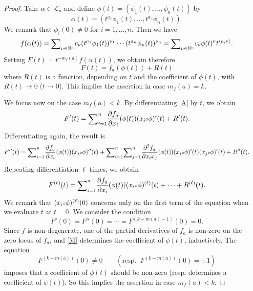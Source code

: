 \documentclass[12pt,a4paper,leqno]{amsart}
\theoremstyle{definition}
\begin{document}
\begin{proof}
Take $\alpha\in\mathcal{L}_a$ and 
define $\phi(t)=(\phi_1(t),\dots,\phi_n(t))$ by 
$$
\alpha(t)=(t^{a_1}\phi_1(t),\dots,t^{a_n}\phi_n(t)).
$$
We remark that $\phi_i(0)\ne0$ for $i=1,\dots,n$. 
Then we have
$$
f(\alpha(t))
={\mathop{\textrm{\scriptsize $\mathop\sum$}}}_{\nu \in {\mathbb{N}}^n} c_\nu
(t^{a_1}\phi_1(t))^{\nu_1}\cdots
(t^{a_n}\phi_n(t))^{\nu_n}\\
={\mathop{\textrm{\scriptsize $\mathop\sum$}}}_{\nu \in {\mathbb{N}}^n} c_\nu
\phi(t)^{\nu}t^{\langle a,\nu\rangle}.
$$
Setting $F(t)=t^{-m_f(a)}f(\alpha(t))$, we obtain therefore 
\begin{equation}\label{A}
F(t)=f_a(\phi(t))+R(t)
\end{equation}
where $R(t)$ is a function, depending on 
$t$ and the coefficient of $\phi(t)$,  with $R(t)\to0$ ($t\to0$). 
This implies the assertion in case $m_f(a)=k$. 

We focus now on the case $m_f(a)<k$. By differentiating \eqref{A} by $t$, we obtain 
$$
F'(t)={\mathop{\textrm{\scriptsize $\mathop\sum$}}}_{i=1}^n{\frac{\partial{f_a}}{\partial{x_i}}}(\phi(t))(x_i{\text{\scriptsize$\circ$}}\phi)'(t)+R'(t).
$$
Differentiating again, the result is
$$
F''(t)=
{\mathop{\textrm{\scriptsize $\mathop\sum$}}}_{i=1}^n{\frac{\partial{f_a}}{\partial{x_i}}}(\phi(t))(x_i{\text{\scriptsize$\circ$}}\phi)''(t)
+{\mathop{\textrm{\scriptsize $\mathop\sum$}}}_{i=1}^n{\mathop{\textrm{\scriptsize $\mathop\sum$}}}_{j=1}^n{\frac{\partial{{}^2f_a}}{\partial{x_ix_j}}}(\phi(t))
(x_i{\text{\scriptsize$\circ$}}\phi)'(t)
(x_j{\text{\scriptsize$\circ$}}\phi)'(t)
+R''(t).
$$
Repeating differentiation $\ell$ times, we obtain 
$$
F^{(\ell)}(t)=
{\mathop{\textrm{\scriptsize $\mathop\sum$}}}_{i=1}^n{\frac{\partial{f_a}}{\partial{x_i}}}(\phi(t))(x_i{\text{\scriptsize$\circ$}}\phi)^{(\ell)}(t)
+\cdots
+R^{(\ell)}(t).
$$
We remark that $(x_i{\text{\scriptsize$\circ$}}\phi)^{(\ell)}(0)$ concerns only on the first
 term of the equation when we evaluate $t$ at $t=0$. 
We consider the condition 
\begin{equation}\label{M}
F'(0)=F''(0)=\cdots=F^{(k-m(a)-1)}(0)=0.
\end{equation}
Since $f$ is non-degenerate, one of the partial derivatives of 
$f_a$ is non-zero on the zero locus of $f_a$, and 
\eqref{M} determines the coefficient of $\phi(t)$, inductively. 
The equation 
$$
F^{(k-m(a))}(0)\ne0\qquad(\textrm{resp. }\ F^{(k-m(a))}(0)=\pm1)
$$ 
imposes that a coefficient of $\phi(t)$ should be non-zero (resp. determines 
a coefficient of $\phi(t)$). 
So this implies the assertion in case $m_f(a)<k$. 
\end{proof}
\end{document}
